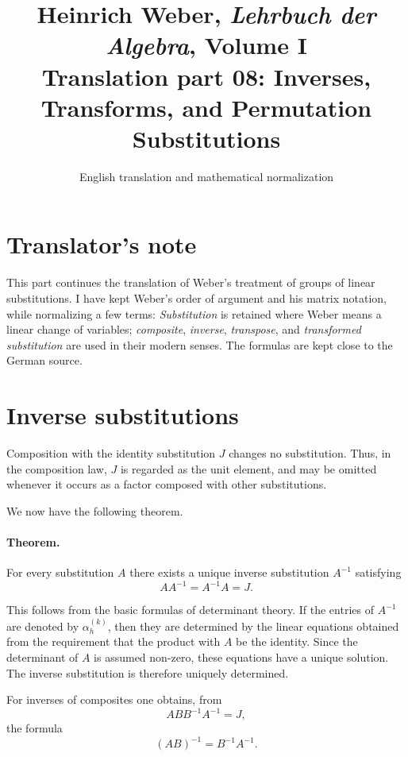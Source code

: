 \documentclass[11pt]{article}
\title{Heinrich Weber, \textit{Lehrbuch der Algebra}, Volume I\\Translation part 08: Inverses, Transforms, and Permutation Substitutions}
\author{English translation and mathematical normalization}
\date{}
\begin{document}
\maketitle

\section*{Translator's note}
This part continues the translation of Weber's treatment of groups of linear substitutions.  I have kept Weber's order of argument and his matrix notation, while normalizing a few terms: \emph{Substitution} is retained where Weber means a linear change of variables; \emph{composite}, \emph{inverse}, \emph{transpose}, and \emph{transformed substitution} are used in their modern senses.  The formulas are kept close to the German source.

\section*{Inverse substitutions}
Composition with the identity substitution $J$ changes no substitution.  Thus, in the composition law, $J$ is regarded as the unit element, and may be omitted whenever it occurs as a factor composed with other substitutions.

We now have the following theorem.

\paragraph{Theorem.} For every substitution $A$ there exists a unique inverse substitution $A^{-1}$ satisfying
\begin{equation}\label{eq:weber8-inverse}
AA^{-1}=A^{-1}A=J.
\end{equation}

This follows from the basic formulas of determinant theory.  If the entries of $A^{-1}$ are denoted by $\alpha_h^{(k)}$, then they are determined by the linear equations obtained from the requirement that the product with $A$ be the identity.  Since the determinant of $A$ is assumed non-zero, these equations have a unique solution.  The inverse substitution is therefore uniquely determined.

For inverses of composites one obtains, from
\[
ABB^{-1}A^{-1}=J,
\]
the formula
\begin{equation}\label{eq:weber8-composite-inverse}
(AB)^{-1}=B^{-1}A^{-1}.
\end{equation}
\end{document}
